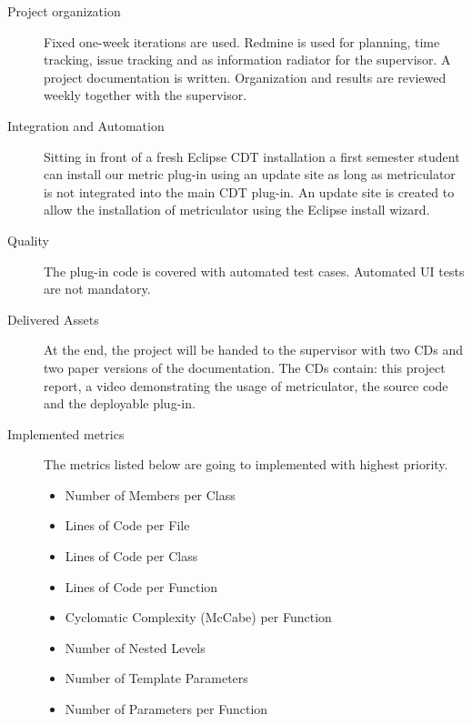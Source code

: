 \documentclass[11pt,a4paper,oneside]{scrreprt}
\begin{document}
\begin{description}
\item[Project organization] Fixed one-week iterations are used. Redmine \cite{redminesetup} is used for planning, time tracking, issue tracking and as information radiator for the supervisor. A project documentation is written. Organization and results are reviewed weekly together with the supervisor.

\item[Integration and Automation] Sitting in front of a fresh Eclipse CDT installation a first semester student can install our metric plug-in using an update site as long as metriculator is not integrated into the main CDT plug-in. An update site is created to allow the installation of metriculator using the Eclipse install wizard.

\item[Quality] The plug-in code is covered with automated test cases. Automated UI tests are not mandatory.

\item[Delivered Assets] At the end, the project will be handed to the supervisor with two CDs and two paper versions of the documentation. The CDs contain: this project report, a video demonstrating the usage of metriculator, the source code and the deployable plug-in.

\item[Implemented metrics] The metrics listed below are going to implemented with highest priority.
\begin{itemize}
\item Number of Members per Class
\item Lines of Code per File
\item Lines of Code per Class
\item Lines of Code per Function
\item Cyclomatic Complexity (McCabe) per Function
\item Number of Nested Levels
\item Number of Template Parameters
\item Number of Parameters per Function
\end{itemize}

\end{description}
\end{document}
